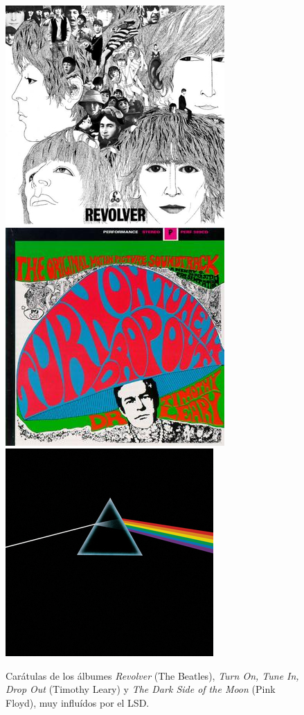 \begin{figure}[H]
	\centering
	\includegraphics[height=.2\textheight]{media/10-revolver.jpg}
	\includegraphics[height=.2\textheight]{media/10-leary.jpg}
	\includegraphics[height=.2\textheight]{media/10-dsotm.png}
	\caption{Carátulas de los álbumes \textit{Revolver} (The Beatles), \textit{Turn On, Tune In, Drop Out} (Timothy Leary) y \textit{The Dark Side of the Moon} (Pink Floyd), muy influídos por el LSD.}
	\label{albums}
\end{figure}

